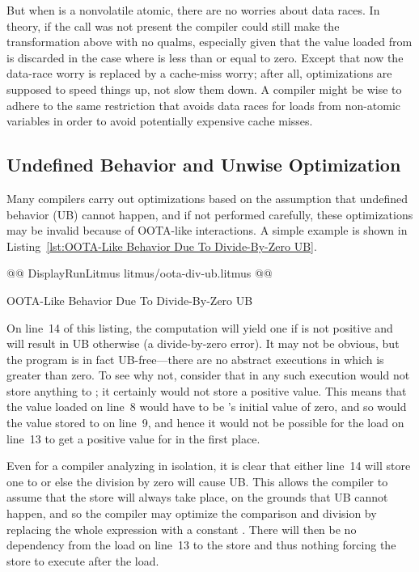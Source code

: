\documentclass[10]{article}
\begin{document}
But when  is a nonvolatile atomic, there are no worries about
data races.
In theory, if the  call was not present
the compiler could still make the transformation above with no
qualms, especially given that the value loaded from  is discarded in
the case where  is less than or equal to zero.
Except that now the data-race worry is replaced by a cache-miss worry;
after all, optimizations are supposed to speed things up,
not slow them down.
A compiler might be wise to adhere to the
same restriction that avoids data races for loads from non-atomic
variables in order to avoid potentially expensive cache misses.

\subsection{Undefined Behavior and Unwise Optimization}
\label{app:Undefined Behavior and Unwise Optimization}

Many compilers carry out optimizations based on the assumption
that undefined behavior (UB) cannot happen,
and if not performed carefully, these optimizations may be invalid
because of OOTA-like interactions.
A simple example is shown in
Listing~\ref{lst:OOTA-Like Behavior Due To Divide-By-Zero UB}.

\begin{listing}[tbp]
@@ DisplayRunLitmus litmus/oota-div-ub.litmus @@
\caption{OOTA-Like Behavior Due To Divide-By-Zero UB}
\label{lst:OOTA-Like Behavior Due To Divide-By-Zero UB}
\end{listing}

On line~14 of this listing, the computation 
will yield one if  is not positive and will result in UB
otherwise (a divide-by-zero error).
It may not be obvious, but the program is in fact UB-free---there are
no abstract executions in which  is greater than zero.
To see why not, consider that in any such execution
 would not store anything to ;
it certainly would not store a positive value.
This means that the value loaded on line~8 would have to be 's
initial value of zero, and so would the value stored to  on
line~9, and hence it would not be possible for the load on line~13
to get a positive value for  in the first place.

Even for a compiler analyzing  in isolation,
it is clear that either line~14 will store one to  or
else the division by zero will cause UB.
This allows the compiler to assume that the store will always
take place, on the grounds that UB cannot happen,
and so the compiler may optimize the comparison and division
by replacing the whole expression with a constant .
There will then be no dependency from the load on line~13
to the store and thus nothing forcing the store to execute
after the load.
\end{document}
